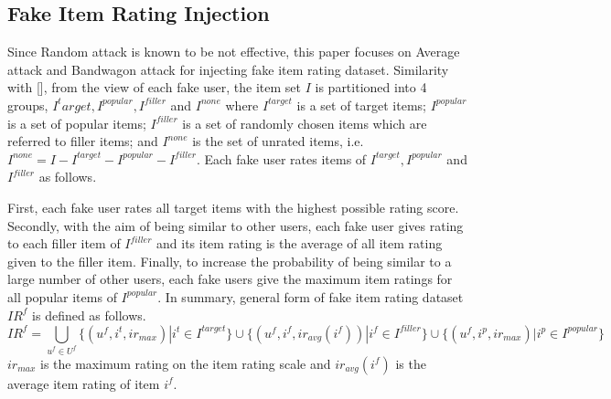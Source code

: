 \documentclass[master,english,final]{kaist-ucs}
\begin{document}
\subsection{Fake Item Rating Injection}
Since Random attack is known to be not effective, this paper focuses on Average attack and Bandwagon attack for injecting fake item rating dataset.
Similarity with [], from the view of each fake user, the item set $I$ is partitioned into 4 groups, $I^target,I^{popular},I^{filler}$  and $I^{none}$ where $I^{target}$ is a set of target items; $I^{popular}$ is a set of popular items; $I^{filler}$ is a set of randomly chosen items which are referred to filler items; and $I^{none}$ is the set of unrated items, i.e. $I^{none}=I-I^{target}-I^{popular}-I^{filler}$. Each fake user rates items of $I^{target},I^{popular}$ and $I^{filler}$ as follows.

First, each fake user rates all target items with the highest possible rating score.  Secondly, with the aim of being similar to other users, each fake user gives rating to each filler item of $I^{filler}$ and its item rating is the average of all item rating given to the filler item. Finally, to increase the probability of being similar to a large number of other users, each fake users give the maximum item ratings for all popular items of $I^{popular}$. In summary, general form of fake item rating dataset $IR^f$ is defined as follows.
\begin{equation}
{IR}^f = \bigcup_{u^f \in U^f} \{(u^f,i^t,ir_{max}) | i^t \in I^{target} \} \cup \{(u^f,i^f,ir_{avg} {(i^f)}) | i^f \in I^{filler} \} \cup \{(u^f,i^p,ir_{max}) | i^p \in I^{popular} \}
\end{equation}
$ir_{max}$  is the maximum rating on the item rating scale and $ir_{avg} {(i^f)}$ is the average item rating of item $i^f$.
\end{document}
